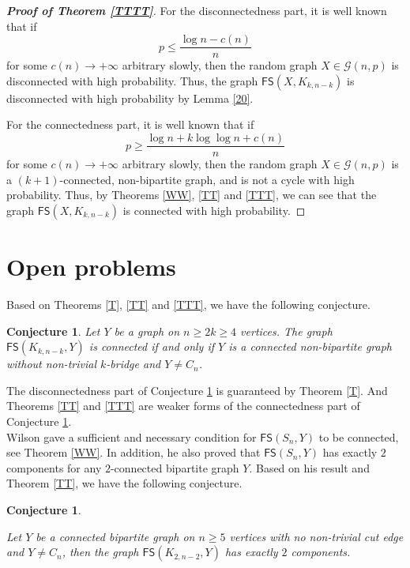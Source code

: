\documentclass[11pt]{article}
\newtheorem{conj}[thm]{Conjecture}
\newcommand{\FS}{\mathsf{FS}}
\begin{document}
\begin{proof}[\bfseries{Proof of Theorem \ref{TTTT}}]

 For the disconnectedness part, it is well known that if 
$$p\le \frac{\log n-c(n)}{n}$$
 for some $c(n)\to +\infty$ arbitrary slowly, then the random graph $X\in \mathcal{G}(n,p)$ is disconnected with high probability. Thus, the graph $\FS(X,K_{k,n-k})$ is disconnected with high probability by Lemma \ref{20}. 

 For the connectedness part, it is well known that if 
$$p\ge \frac{\log n+k\log \log n+c(n)}{n}$$
 for some $c(n)\to +\infty$ arbitrary slowly, then the random graph $X\in \mathcal{G}(n,p)$ is a $(k+1)$-connected, non-bipartite graph, and is not a cycle with high probability. Thus, by Theorems \ref{WW}, \ref{TT} and \ref{TTT}, we can see that the graph $\FS(X,K_{k,n-k})$ is connected with high probability.  
\end{proof}


\section{Open problems}\label{s5}
 

Based on Theorems \ref{T}, \ref{TT} and \ref{TTT}, we have the following conjecture.
\begin{conj}\label{C}
Let $Y$ be a graph on $n\ge 2k\ge 4$ vertices. The graph $\FS(K_{k,n-k},Y)$ is connected if and only if $Y$ is a connected non-bipartite graph without non-trivial $k$-bridge and $Y\not=C_n$.
\end{conj}


 The disconnectedness part of Conjecture \ref{C} is guaranteed by Theorem \ref{T}.
 And Theorems \ref{TT} and \ref{TTT} are  weaker forms of  the connectedness part of Conjecture \ref{C}.\\

 Wilson \cite {W} gave a sufficient and necessary condition for $\mathsf{FS}(S_n,Y)$ to be connected, see  Theorem \ref{WW}. In addition, he also proved that  $\mathsf{FS}(S_n,Y)$  has exactly $2$ components for any   $2$-connected bipartite graph $Y$. Based on his result and Theorem \ref{TT}, we have the following conjecture.
\begin{conj}\label{cc2}

Let  $Y$ be a connected bipartite graph on $n\ge 5$ vertices with no non-trivial cut edge and $Y\not=C_n$, then the graph $\FS(K_{2,n-2},Y)$ has exactly $2$ components.
\end{conj}
  
\end{document}
